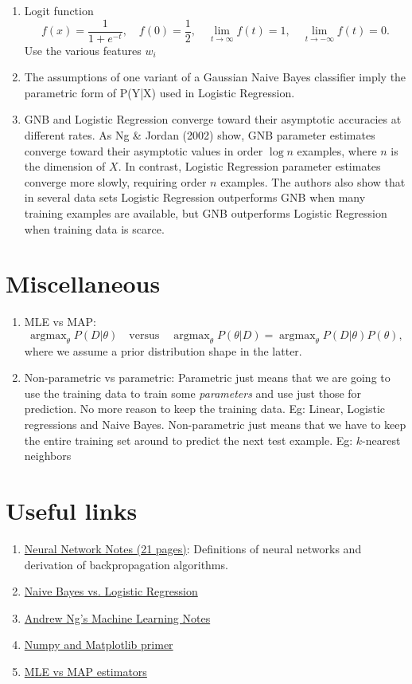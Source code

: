 \documentclass[a4paper]{article}
\DeclareMathOperator{\argmax}{argmax}
\begin{document}
\begin{enumerate}
    \item Logit function $$f(x) = \frac{1}{1+e^{-t}}, \quad f(0)=\frac{1}{2}, \quad \lim_{t\to \infty} f(t) = 1, \quad \lim_{t\to -\infty} f(t) = 0.$$
    Use the various features $w_i$
    \item The assumptions of one variant of a Gaussian Naive
    Bayes classifier imply the parametric form of P(Y|X) used in Logistic Regression. 
    \item GNB and Logistic Regression converge toward their asymptotic accuracies
    at different rates. As Ng \& Jordan (2002) show, GNB parameter estimates
    converge toward their asymptotic values in order $\log n$ examples, where $n$
    is the dimension of $X$. In contrast, Logistic Regression parameter estimates
    converge more slowly, requiring order $n$ examples. The authors also show
    that in several data sets Logistic Regression outperforms GNB when many
    training examples are available, but GNB outperforms Logistic Regression
    when training data is scarce.
    
\end{enumerate}
\section{Miscellaneous}
\begin{enumerate}
    \item MLE vs MAP: $${\argmax}_{\theta} P(D|\theta)\quad \text{versus} \quad \argmax_{\theta} P(\theta|D) = \argmax_{\theta} P(D|\theta)P(\theta),$$ 
    where we assume a prior distribution shape in the latter.
    \item Non-parametric vs parametric: Parametric just means that we are going to use the training data to train some \emph{parameters} and use just those for prediction. No more reason to keep the training data. Eg: Linear, Logistic regressions and Naive Bayes. Non-parametric just means that we have to keep the entire training set around to predict the next test example. Eg: $k$-nearest neighbors
\end{enumerate}
\section{Useful links }
\begin{enumerate}
\item \href{http://cs229.stanford.edu/notes2020spring/cs229-notes-deep_learning.pdf}{Neural Network Notes (21 pages)}: Definitions of neural networks and derivation of backpropagation algorithms.
    \item \href{https://www.cs.cmu.edu/~tom/mlbook/NBayesLogReg.pdf}{Naive Bayes vs. Logistic Regression}
    \item \href{https://sgfin.github.io/files/notes/CS229_Lecture_Notes.pdf}{Andrew Ng's Machine Learning Notes}
    \item \href{http://cs229.stanford.edu/notes2021spring/notes2021spring/python-review-code.pdf}{Numpy and Matplotlib primer}
    \item\href{http://www.cs.cmu.edu/~tom/mlbook/Joint_MLE_MAP.pdf}{MLE vs MAP estimators}
\end{enumerate}
\end{document}
